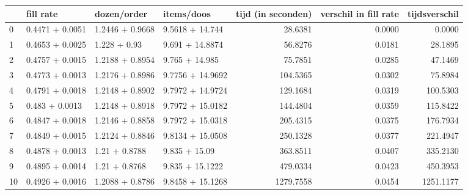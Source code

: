 \begin{tabular}{llllrrr}
\toprule
{} &        fill rate &      dozen/order &        items/doos &  tijd (in seconden) &  verschil in fill rate &  tijdsverschil \\
\midrule
0  &  0.4471 + 0.0051 &  1.2446 + 0.9668 &   9.5618 + 14.744 &             28.6381 &                 0.0000 &         0.0000 \\
1  &  0.4653 + 0.0025 &     1.228 + 0.93 &   9.691 + 14.8874 &             56.8276 &                 0.0181 &        28.1895 \\
2  &  0.4757 + 0.0015 &  1.2188 + 0.8954 &    9.765 + 14.985 &             75.7851 &                 0.0285 &        47.1469 \\
3  &  0.4773 + 0.0013 &  1.2176 + 0.8986 &  9.7756 + 14.9692 &            104.5365 &                 0.0302 &        75.8984 \\
4  &  0.4791 + 0.0018 &  1.2148 + 0.8902 &  9.7972 + 14.9724 &            129.1684 &                 0.0319 &       100.5303 \\
5  &   0.483 + 0.0013 &  1.2148 + 0.8918 &  9.7972 + 15.0182 &            144.4804 &                 0.0359 &       115.8422 \\
6  &  0.4847 + 0.0018 &  1.2146 + 0.8858 &  9.7972 + 15.0318 &            205.4315 &                 0.0375 &       176.7934 \\
7  &  0.4849 + 0.0015 &  1.2124 + 0.8846 &  9.8134 + 15.0508 &            250.1328 &                 0.0377 &       221.4947 \\
8  &  0.4878 + 0.0013 &    1.21 + 0.8788 &     9.835 + 15.09 &            363.8511 &                 0.0407 &       335.2130 \\
9  &  0.4895 + 0.0014 &    1.21 + 0.8768 &   9.835 + 15.1222 &            479.0334 &                 0.0423 &       450.3953 \\
10 &  0.4926 + 0.0016 &  1.2088 + 0.8786 &  9.8458 + 15.1268 &           1279.7558 &                 0.0454 &      1251.1177 \\
\bottomrule
\end{tabular}
